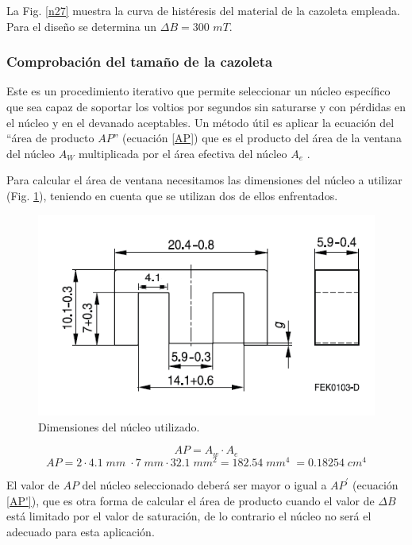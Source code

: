 \documentclass[11pt, a4paper]{article}
\begin{document}
La Fig. \ref{n27} muestra la curva de histéresis del material de la cazoleta empleada. Para el diseño se determina un $\Delta B = 300$ $mT$.
\subsubsection{Comprobación del tamaño de la cazoleta}
Este es un procedimiento iterativo que permite seleccionar un núcleo específico que sea capaz de soportar los voltios por segundos sin saturarse y con pérdidas en el núcleo y en el devanado aceptables. 
Un método útil es aplicar la ecuación del “área de producto $AP$” (ecuación \ref{AP}) que es el producto del área de la ventana del núcleo $A_W$ multiplicada por el área efectiva del núcleo $A_e$ . 

Para calcular el área de ventana necesitamos las dimensiones del núcleo a utilizar (Fig. \ref{cazoleta}), teniendo en cuenta que se utilizan dos de ellos enfrentados.

\begin{figure}[h]
	\centering
	\includegraphics[width = 10 cm]{Imagenes/cazoleta}
	\caption{Dimensiones del núcleo utilizado.}
	\label{cazoleta}
\end{figure}

\begin{equation}
AP = A_w \cdot A_e
\label{AP}
\end{equation}
\[ AP = 2\cdot 4.1 \; mm \; \cdot 7 \; mm \cdot 32.1 \; mm^2 = 182.54 \; mm^4 \; = 0.18254 \; cm^4 \]

El valor de $AP$ del núcleo seleccionado deberá ser mayor o igual a $AP^{'}$ (ecuación \ref{AP'}), que es otra forma de calcular el área de producto cuando el valor de $\Delta B$ está limitado por el valor de saturación, de lo contrario el núcleo no será el adecuado para esta aplicación.
\end{document}
